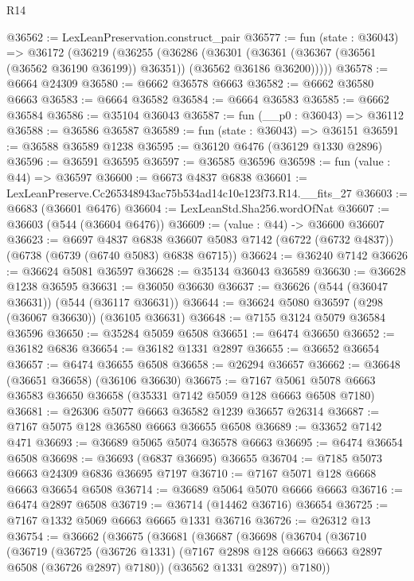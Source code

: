 \begin{lexlean}{R14}
\begin{coremodule}
@36562 := LexLeanPreservation.construct_pair
@36577 := fun (state : @36043) =>
  @36172
    (@36219
      (@36255
        (@36286
          (@36301
            (@36361 (@36367 (@36561 (@36562 @36190 @36199)) @36351))
            (@36562 @36186 @36200)))))
@36578 := @6664 @24309
@36580 := @6662 @36578 @6663
@36582 := @6662 @36580 @6663
@36583 := @6664 @36582
@36584 := @6664 @36583
@36585 := @6662 @36584
@36586 := @35104 @36043
@36587 := fun (__p0 : @36043) => @36112
@36588 := @36586 @36587
@36589 := fun (state : @36043) => @36151
@36591 := @36588 @36589 @1238
@36595 := @36120 @6476 (@36129 @1330 @2896)
@36596 := @36591 @36595
@36597 := @36585 @36596
@36598 := fun (value : @44) => @36597
@36600 := @6673 @4837 @6838
@36601 := LexLeanPreserve.Cc265348943ac75b534ad14c10e123f73.R14.__fits_27
@36603 := @6683 (@36601 @6476)
@36604 := LexLeanStd.Sha256.wordOfNat
@36607 := @36603 (@544 (@36604 @6476))
@36609 := (value : @44) -> @36600 @36607
@36623 := @6697
    @4837
    @6838
    @36607
    @5083
    @7142
    (@6722 (@6732 @4837))
    (@6738 (@6739 (@6740 @5083) @6838 @6715))
@36624 := @36240 @7142
@36626 := @36624 @5081 @36597
@36628 := @35134 @36043 @36589
@36630 := @36628 @1238 @36595
@36631 := @36050 @36630
@36637 := @36626 (@544 (@36047 @36631)) (@544 (@36117 @36631))
@36644 := @36624 @5080 @36597 (@298 (@36067 @36630)) (@36105 @36631)
@36648 := @7155 @3124 @5079 @36584 @36596
@36650 := @35284 @5059 @6508
@36651 := @6474 @36650
@36652 := @36182 @6836
@36654 := @36182 @1331 @2897
@36655 := @36652 @36654
@36657 := @6474 @36655 @6508
@36658 := @26294 @36657
@36662 := @36648 (@36651 @36658) (@36106 @36630)
@36675 := @7167 @5061 @5078 @6663 @36583 @36650 @36658 (@35331 @7142 @5059 @128 @6663 @6508 @7180)
@36681 := @26306 @5077 @6663 @36582 @1239 @36657 @26314
@36687 := @7167 @5075 @128 @36580 @6663 @36655 @6508
@36689 := @33652 @7142 @471
@36693 := @36689 @5065 @5074 @36578 @6663
@36695 := @6474 @36654 @6508
@36698 := @36693 (@6837 @36695) @36655
@36704 := @7185 @5073 @6663 @24309 @6836 @36695 @7197
@36710 := @7167 @5071 @128 @6668 @6663 @36654 @6508
@36714 := @36689 @5064 @5070 @6666 @6663
@36716 := @6474 @2897 @6508
@36719 := @36714 (@14462 @36716) @36654
@36725 := @7167 @1332 @5069 @6663 @6665 @1331 @36716
@36726 := @26312 @13
@36754 := @36662
    (@36675
      (@36681
        (@36687
          (@36698
            (@36704
              (@36710
                (@36719
                  (@36725
                    (@36726 @1331)
                    (@7167 @2898 @128 @6663 @6663 @2897 @6508 (@36726 @2897) @7180))
                  (@36562 @1331 @2897))
                @7180))

\end{coremodule}
\end{lexlean}
